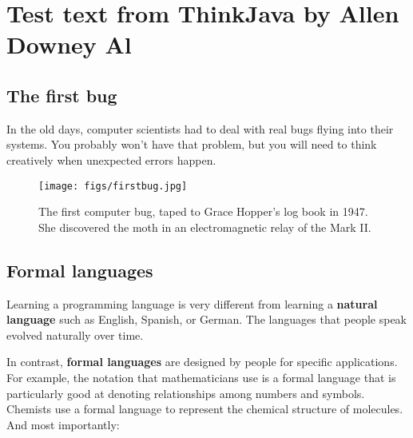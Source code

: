 \chapter{Test text from ThinkJava by Allen Downey Al}


\section{The first bug}


In the old days, computer scientists had to deal with real bugs flying into their systems.
You probably won't have that problem, but you will need to think creatively when unexpected errors happen.

\begin{figure}[!ht]
\begin{center}
\texttt{[image: figs/firstbug.jpg]}
\caption{The first computer bug, taped to Grace Hopper's log book in 1947.
\\ She discovered the moth in an electromagnetic relay of the Mark II.}
\end{center}
\end{figure}



\section{Formal languages}


Learning a programming language is very different from learning a {\bf natural language} such as English, Spanish, or German.
The languages that people speak evolved naturally over time.


In contrast, {\bf formal languages} are designed by people for specific applications.
For example, the notation that mathematicians use is a formal language that is particularly good at denoting relationships among numbers and symbols.
Chemists use a formal language to represent the chemical structure of molecules.
And most importantly:


